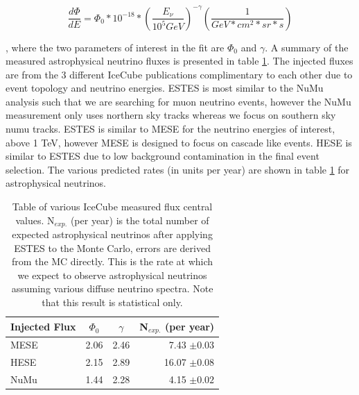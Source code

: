 \documentclass{PoS}
\begin{document}
\begin{equation}
\frac{d\Phi}{dE} = \Phi_{0} * 10^{-18} * (\frac{E_{\nu}}{10^{5} GeV})^{-\gamma} (\frac{1}{GeV*cm^{2}*sr*s})
\end{equation}

, where the two parameters of interest in the fit are $\Phi_{0}$ and $\gamma$. 
A summary of the measured astrophysical neutrino fluxes is presented in table \ref{tab:fluxes}. The injected fluxes are from the 3 different IceCube publications complimentary to each other due to event topology and neutrino energies. ESTES is most similar to the NuMu analysis\cite{icrc:numu} such that we are searching for muon neutrino events, however the NuMu measurement only uses northern sky tracks whereas we focus on southern sky numu tracks. ESTES is similar to MESE \cite{MESE:2year} for the neutrino energies of interest, above 1 TeV, however MESE is designed to focus on cascade like events. HESE\cite{Austin:HESE} is similar to ESTES due to low background contamination in the final event selection. The various predicted rates (in units per year) are shown in table \ref{tab:fluxes} for astrophysical neutrinos. 

\begin{table}[h!]
\centering 
\begin{tabular}{l|c|c|r}
\hline
Injected Flux & $\Phi_{0}$ & $\gamma$ & N$_{exp.}$ (per year) \\ \hline \hline 
MESE\cite{MESE:2year} & 2.06 & 2.46 & 7.43 $\pm0.03$ \\ \hline
HESE\cite{Austin:HESE} & 2.15 & 2.89 & 16.07 $\pm0.08$ \\ \hline
NuMu\cite{icrc:numu} & 1.44 & 2.28 & 4.15 $\pm0.02$ \\ \hline
\end{tabular}
\caption{Table of various IceCube measured flux central values. N$_{exp.}$ (per year) is the total number of expected astrophysical neutrinos after applying ESTES to the Monte Carlo, errors are derived from the MC directly. This is the rate at which we expect to observe astrophysical neutrinos assuming various diffuse neutrino spectra. Note that this result is statistical only.}
\label{tab:fluxes}
\end{table}

\end{document}
